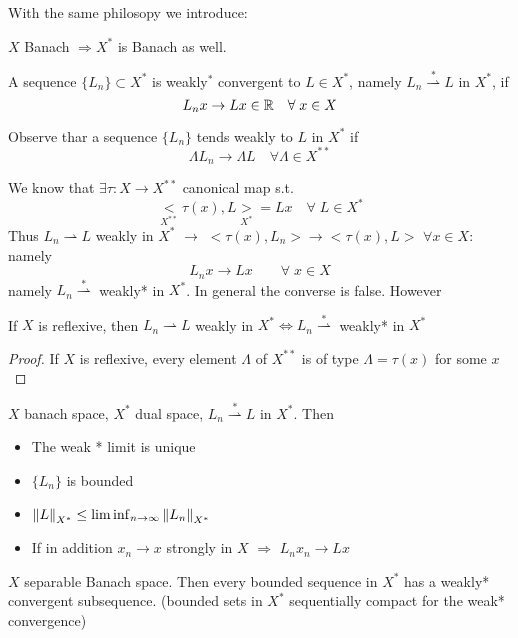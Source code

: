 With the same philosopy we introduce: 
\begin{definition}
    \(X \) Banach \(\Rightarrow X^* \) is Banach as well.
\end{definition}
\begin{definition}
    A sequence \(\{L_n \} \subset X^*\) is weakly\(^*\) convergent to \(L \in  X^*\), namely \(L_n \overset{*}{\rightharpoonup} L\) in \(X^*\), if 
    \[
        L_n x \to Lx \in \mathbb{R} \quad \forall\; x \in X
    \]
\end{definition}
\begin{remark}
    Observe thar a sequence \(\{L_n\} \) tends weakly to \(L\) in \(X^*\) if 
    \[
        \Lambda L_n \to \Lambda L \quad \forall \Lambda \in X^{**}
    \]
\end{remark}
We know that \(\exists \tau:X \to X^{**}\) canonical map s.t. 
\[
    \underset{X^{**}}{<}\tau(x), L \underset{X^*}{>} = Lx \quad \forall \; L \in X^*
\]
Thus \(L_n \rightharpoonup L\) weakly in \(X^*\) \(\rightarrow\) \(<\tau(x), L_n> \to <\tau(x), L>\) \(\forall x \in X:\) namely
\[
    L_n x \to Lx \qquad \forall \; x \in X
\]
namely \(L_n \overset{*}{\rightharpoonup}\) weakly* in \(X^*\). In general the converse is false. However
\begin{proposition}
    If \(X\) is reflexive, then \(L_n \rightharpoonup L\) weakly in \(X^* \iff L_n \overset{*}{\rightharpoonup}\) weakly* in \(X^*\)
\end{proposition}
\begin{proof}
    If \(X\) is reflexive, every element \(\Lambda\) of \(X^{**}\) is of type \(\Lambda = \tau(x)\) for some \(x\)
\end{proof}
\begin{proposition}
    \(X\) banach space, \(X^*\) dual space, \(L_n \overset{*}{\rightharpoonup} L\) in \(X^*\). Then
    \begin{itemize}
        \item The weak * limit is unique
        \item \(\{L_n\}\) is bounded
        \item \(\norm{L}_{X^*} \leq \liminf _{n \to \infty} \norm{L_n}_{X^*}\)
        \item If in addition \(x_n \to x\) strongly in \(X\) \(\Rightarrow\) \(L_nx_n \to Lx\) 
    \end{itemize}
\end{proposition}

\begin{theorem}
    \(X \) separable Banach space. Then every bounded sequence in \(X^*\) has a weakly* convergent subsequence. (bounded sets in \(X^* \) sequentially compact for the weak* convergence)
\end{theorem}

